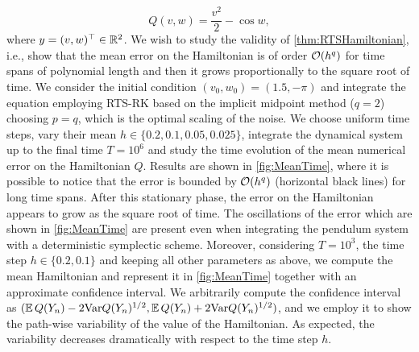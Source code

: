 \documentclass[10pt]{article}
\begin{document}
\begin{equation}
Q(v, w) = \frac{v^2}{2} - \cos w,
\end{equation}
where $y = (v, w)^\top \in \mathbb{R}^2$. We wish to study the validity of \cref{thm:RTSHamiltonian}, i.e., show that the mean error on the Hamiltonian is of order $\mathcal{O}(h^q)$ for time spans of polynomial length and then it grows proportionally to the square root of time. We consider the initial condition $(v_0, w_0) = (1.5, -\pi)$ and integrate the equation employing RTS-RK based on the implicit midpoint method ($q = 2$) choosing $p = q$, which is the optimal scaling of the noise. We choose uniform time steps, vary their mean $h \in \{0.2, 0.1, 0.05, 0.025\}$, integrate the dynamical system up to the final time $T = 10^6$ and study the time evolution of the mean numerical error on the Hamiltonian $Q$. Results are shown in \cref{fig:MeanTime}, where it is possible to notice that the error is bounded by $\mathcal{O}(h^q)$ (horizontal black lines) for long time spans. After this stationary phase, the error on the Hamiltonian appears to grow as the square root of time. The oscillations of the error which are shown in \cref{fig:MeanTime} are present even when integrating the pendulum system with a deterministic symplectic scheme. {Moreover, considering $T = 10^3$, the time step $h \in \{0.2, 0.1\}$ and keeping all other parameters as above, we compute the mean Hamiltonian and represent it in \cref{fig:MeanTime} together with an approximate confidence interval. We arbitrarily compute the confidence interval as $(\operatorname{\mathbb{E}} Q(Y_n) - 2 \mathrm{Var}Q(Y_n)^{1/2}, \operatorname{\mathbb{E}} Q(Y_n) + 2 \mathrm{Var}Q(Y_n)^{1/2})$, and we employ it to show the path-wise variability of the value of the Hamiltonian. As expected, the variability decreases dramatically with respect to the time step $h$.}
\end{document}
